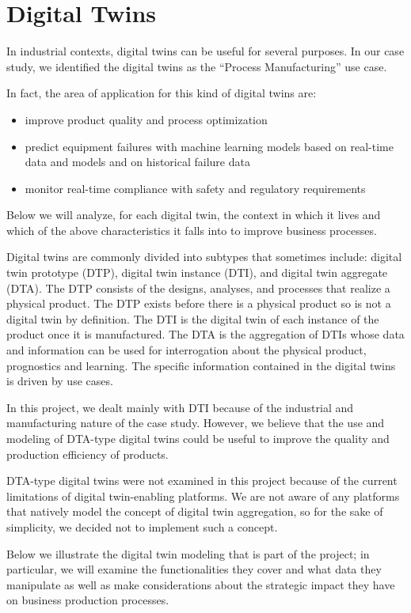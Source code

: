 \chapter{Digital Twins}
In industrial contexts, digital twins can be useful for several purposes.
In our case study, we identified the digital twins as the ``Process Manufacturing'' use case.

In fact, the area of application for this kind of digital twins are:
\begin{itemize}
	\item improve product quality and process optimization
	\item predict equipment failures with machine learning models based on real-time data and models and on historical failure data
	\item monitor real-time compliance with safety and regulatory requirements
\end{itemize}
Below we will analyze, for each digital twin, the context in which it lives and which of the above characteristics it falls into to improve business processes.

Digital twins are commonly divided into subtypes that sometimes include: digital twin prototype (DTP), digital twin instance (DTI), and digital twin aggregate (DTA).
The DTP consists of the designs, analyses, and processes that realize a physical product.
The DTP exists before there is a physical product so is not a digital twin by definition.
The DTI is the digital twin of each instance of the product once it is manufactured.
The DTA is the aggregation of DTIs whose data and information can be used for interrogation about the physical product, prognostics and learning.
The specific information contained in the digital twins is driven by use cases.

In this project, we dealt mainly with DTI because of the industrial and manufacturing nature of the case study.
However, we believe that the use and modeling of DTA-type digital twins could be useful to improve the quality and production efficiency of products.

DTA-type digital twins were not examined in this project because of the current limitations of digital twin-enabling platforms.
We are not aware of any platforms that natively model the concept of digital twin aggregation, so for the sake of simplicity, we decided not to implement such a concept.


Below we illustrate the digital twin modeling that is part of the project; in particular, we will examine the functionalities they cover and what data they
manipulate as well as make considerations about the strategic impact they have on business production processes.

